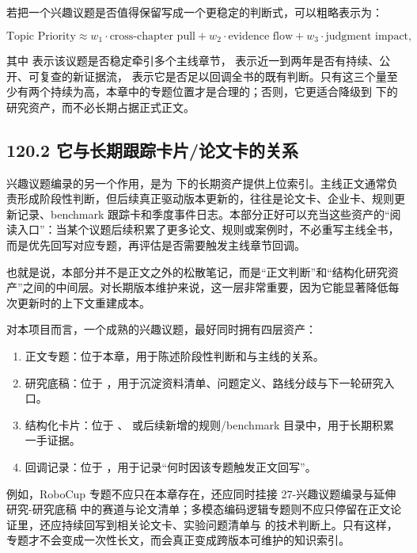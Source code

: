 若把一个兴趣议题是否值得保留写成一个更稳定的判断式，可以粗略表示为：

\begingroup
\scriptsize
\begin{equation*}
\text{Topic Priority} \approx w_1 \cdot \text{cross-chapter pull} + w_2 \cdot \text{evidence flow} + w_3 \cdot \text{judgment impact},
\end{equation*}
\endgroup

其中 \texttt{} 表示该议题是否稳定牵引多个主线章节，\texttt{} 表示近一到两年是否有持续、公开、可复查的新证据流，\texttt{} 表示它是否足以回调全书的既有判断。只有这三个量至少有两个持续为高，本章中的专题位置才是合理的；否则，它更适合降级到  下的研究资产，而不必长期占据正式正文。

\subsection*{120.2 它与长期跟踪卡片/论文卡的关系}


兴趣议题编录的另一个作用，是为  下的长期资产提供上位索引。主线正文通常负责形成阶段性判断，但后续真正驱动版本更新的，往往是论文卡、企业卡、规则更新记录、benchmark 跟踪卡和季度事件日志。本部分正好可以充当这些资产的“阅读入口”：当某个议题后续积累了更多论文、规则或案例时，不必重写主线全书，而是优先回写对应专题，再评估是否需要触发主线章节回调。

也就是说，本部分并不是正文之外的松散笔记，而是“正文判断”和“结构化研究资产”之间的中间层。对长期版本维护来说，这一层非常重要，因为它能显著降低每次更新时的上下文重建成本。

对本项目而言，一个成熟的兴趣议题，最好同时拥有四层资产：

\begin{enumerate}
\item 正文专题：位于本章，用于陈述阶段性判断和与主线的关系。
\item 研究底稿：位于 ，用于沉淀资料清单、问题定义、路线分歧与下一轮研究入口。
\item 结构化卡片：位于 、 或后续新增的规则/benchmark 目录中，用于长期积累一手证据。
\item 回调记录：位于 ，用于记录“何时因该专题触发正文回写”。
\end{enumerate}

例如，RoboCup 专题不应只在本章存在，还应同时挂接 27-兴趣议题编录与延伸研究-研究底稿 中的赛道与论文清单；多模态编码逻辑专题则不应只停留在正文论证里，还应持续回写到相关论文卡、实验问题清单与  的技术判断上。只有这样，专题才不会变成一次性长文，而会真正变成跨版本可维护的知识索引。

